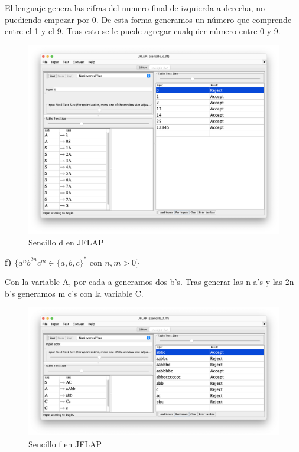 El lenguaje genera las cifras del numero final de izquierda a derecha, no puediendo empezar por 0. De esta forma generamos un número que comprende
entre el 1 y el 9. Tras esto se le puede agregar cualquier número entre 0 y 9.

\begin{figure}[H] 
	\centering
	\includegraphics[scale=0.35]{../practica_1/images/sencillo_d.png} 
	\caption{Sencillo d en JFLAP} 
    \label{fig:sencillo_d}
\end{figure}

\textbf{f)}  $\{ a^{n} b^{2n} c^{m} \in \{a,b,c\}^{\ast}$ con $n,m > 0\}$

Con la variable A, por cada a generamos dos b's. Tras generar las n a's y las 2n b's generamos m c's con la variable C.

\begin{figure}[H] 
	\centering
	\includegraphics[scale=0.35]{../practica_1/images/sencillo_f.png} 
	\caption{Sencillo f en JFLAP} 
    \label{fig:sencillo_f}
\end{figure}


